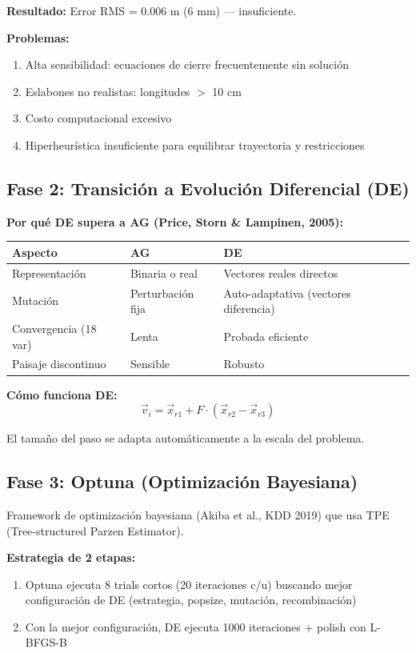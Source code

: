 \documentclass[11pt,letterpaper]{article}
\begin{document}
\textbf{Resultado:} Error RMS = 0.006 m (6 mm) --- insuficiente.

\textbf{Problemas:}
\begin{enumerate}
\item Alta sensibilidad: ecuaciones de cierre frecuentemente sin soluci\'on
\item Eslabones no realistas: longitudes $>$ 10 cm
\item Costo computacional excesivo
\item Hiperheur\'istica insuficiente para equilibrar trayectoria y restricciones
\end{enumerate}

\subsection{Fase 2: Transici\'on a Evoluci\'on Diferencial (DE)}

\textbf{Por qu\'e DE supera a AG (Price, Storn \& Lampinen, 2005):}

\begin{tabular}{lll}
\toprule
Aspecto & AG & DE \\
\midrule
Representaci\'on & Binaria o real & Vectores reales directos \\
Mutaci\'on & Perturbaci\'on fija & Auto-adaptativa (vectores diferencia) \\
Convergencia (18 var) & Lenta & Probada eficiente \\
Paisaje discontinuo & Sensible & Robusto \\
\bottomrule
\end{tabular}

\vspace{0.3cm}
\textbf{C\'omo funciona DE:}
$$\vec{v}_i = \vec{x}_{r1} + F \cdot (\vec{x}_{r2} - \vec{x}_{r3})$$

El tama\~no del paso se adapta autom\'aticamente a la escala del problema.

\subsection{Fase 3: Optuna (Optimizaci\'on Bayesiana)}

Framework de optimizaci\'on bayesiana (Akiba et al., KDD 2019) que usa TPE (Tree-structured Parzen Estimator).

\textbf{Estrategia de 2 etapas:}
\begin{enumerate}
\item Optuna ejecuta 8 trials cortos (20 iteraciones c/u) buscando mejor configuraci\'on de DE (estrategia, popsize, mutaci\'on, recombinaci\'on)
\item Con la mejor configuraci\'on, DE ejecuta 1000 iteraciones + polish con L-BFGS-B
\end{enumerate}
\end{document}
